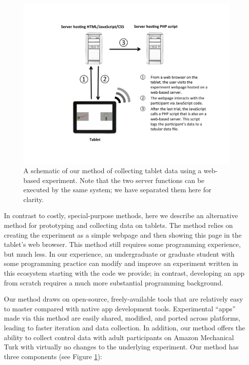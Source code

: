 \documentclass[man,noapacite]{apa2}
\begin{document}
\begin{figure}[t] 
  \begin{center} 
    \includegraphics[width=4.5in]{figures/diagram.pdf} 
    \caption{\label{fig:diagram} A schematic of our method of collecting tablet data using a web-based experiment. Note that the two server functions can be executed by the same system; we have separated them here for clarity.}
  \end{center} 
\end{figure}

In contrast to costly, special-purpose methods, here we describe an alternative method for prototyping and collecting data on tablets. The method relies on creating the experiment as a simple webpage and then showing this page in the tablet's web browser. This method still requires some programming experience, but much less. In our experience, an undergraduate or graduate student with some programming practice can modify and improve an experiment written in this ecosystem starting with the code we provide; in contrast, developing an app from scratch requires a much more substantial programming background.

Our method draws on open-source, freely-available tools that are relatively easy to master compared with native app development tools. Experimental ``apps'' made via this method are easily shared, modified, and ported across platforms, leading to faster iteration and data collection. In addition, our method offers the ability to collect control data with adult participants on Amazon Mechanical Turk \cite{paolacci2010,crump2013} with virtually no changes to the underlying experiment. Our method has three components (see Figure \ref{fig:diagram}):
\end{document}
